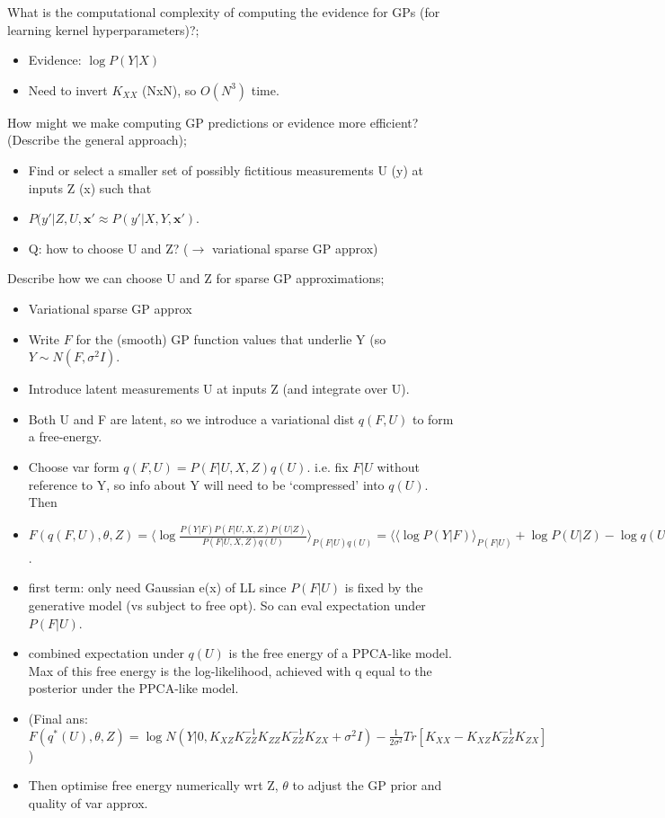 \documentclass{article}
\begin{document}
What is the computational complexity of computing the evidence for GPs (for learning kernel hyperparameters)?; \begin{itemize} \item Evidence:  $\log P(Y|X)$ \item Need to invert $K_{XX}$ (NxN), so $O(N^3)$ time. \end{itemize}

How might we make computing GP predictions or evidence more efficient? (Describe the general approach); \begin{itemize} \item Find or select a smaller set of possibly fictitious measurements U (y) at inputs Z (x) such that  \item $P(y'|Z, U, \mathbf{x'}\approx P(y'|X, Y, \mathbf{x'})$. \item Q: how to choose U and Z? ($\rightarrow$ variational sparse GP approx) \end{itemize}

Describe how we can choose U and Z for sparse GP approximations; \begin{itemize} \item Variational sparse GP approx \item Write $F$ for the (smooth) GP function values that underlie Y (so $Y\sim N(F, \sigma^2I)$. \item Introduce latent measurements U at inputs Z (and integrate over U).  \item Both U and F are latent, so we introduce a variational dist $q(F, U)$ to form a free-energy. \item Choose var form $q(F, U)=P(F|U, X, Z)q(U)$. i.e. fix $F|U$ without reference to Y, so info about Y will need to be `compressed' into $q(U)$. Then \item $F(q(F, U), \theta, Z)=\langle \log \frac{P(Y|F)P(F|U,X,Z)P(U|Z)}{P(F|U,X,Z)q(U)}\rangle_{P(F|U)q(U)} = \langle \langle \log P(Y|F)\rangle_{P(F|U)} + \log P(U|Z) - \log q(U) \rangle_{q(U)}$. \item first term: only need Gaussian e(x) of LL since $P(F|U)$ is fixed by the generative model (vs subject to free opt). So can eval expectation under $P(F|U)$. \item combined expectation under $q(U)$ is the free energy of a PPCA-like model. Max of this free energy is the log-likelihood, achieved with q equal to the posterior under the PPCA-like model. \item (Final ans: $F(q^*(U), \theta, Z)=\log N(Y|0, K_{XZ}K^{-1}_{ZZ}K_{ZZ}K_{ZZ}^{-1}K_{ZX}+\sigma^2I) -\frac{1}{2\sigma^2}Tr[K_{XX}-K_{XZ}K_{ZZ}^{-1}K_{ZX}]$) \item Then optimise free energy numerically wrt Z, $\theta$ to adjust the GP prior and quality of var approx. \end{itemize}
\end{document}

